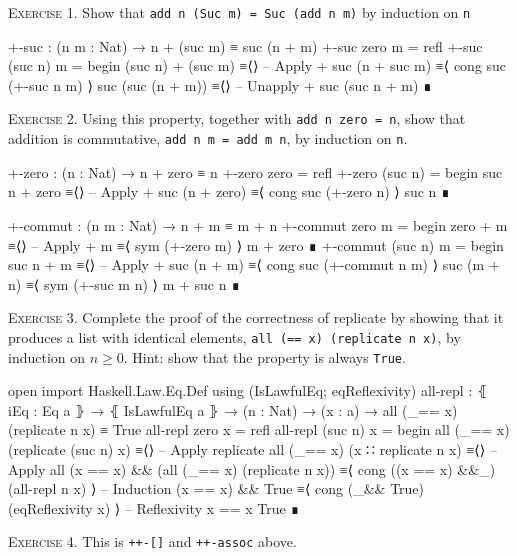 \documentclass{article}
\begin{document}
\noindent
\textsc{Exercise 1.} Show that \verb!add n (Suc m) = Suc (add n m)! by induction on \texttt{n}

\begin{code}
+-suc : (n m : Nat) → n + (suc m) ≡ suc (n + m)
+-suc zero m = refl
+-suc (suc n) m =
  begin
    (suc n) + (suc m)
  ≡⟨⟩ -- Apply +
    suc (n + suc m)
  ≡⟨ cong suc (+-suc n m) ⟩
    suc (suc (n + m))
  ≡⟨⟩ -- Unapply +
    suc (suc n + m)
  ∎
\end{code}

\noindent
\textsc{Exercise 2.} Using this property, together with \texttt{add n zero = n}, show that addition is commutative, \texttt{add n m = add m n}, by induction on \texttt{n}.

\begin{code}
+-zero : (n : Nat) → n + zero ≡ n
+-zero zero = refl
+-zero (suc n) =
  begin
    suc n + zero
  ≡⟨⟩ -- Apply +
    suc (n + zero)
  ≡⟨ cong suc (+-zero n) ⟩
    suc n
  ∎
\end{code}
\begin{code}
+-commut : (n m : Nat) → n + m ≡ m + n
+-commut zero m =
  begin
    zero + m
  ≡⟨⟩ -- Apply +
    m
  ≡⟨ sym (+-zero m) ⟩
    m + zero
  ∎
+-commut (suc n) m =
  begin
    suc n + m
  ≡⟨⟩ -- Apply +
    suc (n + m)
  ≡⟨ cong suc (+-commut n m) ⟩
    suc (m + n)
  ≡⟨ sym (+-suc m n) ⟩
    m + suc n
  ∎
\end{code}

\noindent
\textsc{Exercise 3.}
Complete the proof of the correctness of replicate by showing that it produces a list with identical elements, \verb!all (== x) (replicate n x)!, by induction on $n ≥ 0$. Hint: show that the property is always \verb!True!.

\begin{code}
open import Haskell.Law.Eq.Def using (IsLawfulEq; eqReflexivity)
all-repl : ⦃ iEq : Eq a ⦄ → ⦃ IsLawfulEq a ⦄ → (n : Nat) → (x : a)
    → all (_== x) (replicate n x) ≡ True
all-repl zero x = refl
all-repl (suc n) x =
  begin
    all (_== x) (replicate (suc n) x)
  ≡⟨⟩ -- Apply replicate
    all (_== x) (x ∷ replicate n x)
  ≡⟨⟩ -- Apply all
    (x == x) && (all (_== x) (replicate n x))
  ≡⟨ cong ((x == x) &&_) (all-repl n x) ⟩ -- Induction
    (x == x) && True
  ≡⟨ cong (_&& True) (eqReflexivity x) ⟩ -- Reflexivity x == x
    True
  ∎
\end{code}

\noindent
\textsc{Exercise 4.} This is \verb!++-[]! and \verb!++-assoc! above.
\vspace{3pt}
\end{document}
